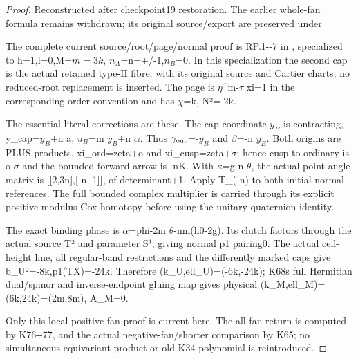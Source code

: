 \begin{proof}
Reconstructed after checkpoint19 restoration. The earlier whole-fan formula remains withdrawn; its original source/export are preserved under 

The complete current source/root/page/normal proof is RP.1-\/-7 in , specialized to h=1,l=0,M=\(m=3k\), \(n_A\)=n=+/-1,\(n_B\)=0. In this specialization the second cap is the actual retained type-II fibre, with its original source and Cartier charts; no reduced-root replacement is inserted. The page is \(\eta\)\^{}m-\(\tau\) xi=1 in the corresponding order convention and has \(\chi\)=k, N²=-2k.

The essential literal corrections are these. The cap coordinate \(y_B\) is contracting, y\_cap=\(y_B\)+n a, \(u_B\)=m \(y_B\)+n \(\alpha\). Thus \(\gamma_{\rm out}\)=-\(y_B\) and \(\beta\)=-n \(y_B\). Both origins are PLUS products, xi\_ord=zeta+o and xi\_cusp=zeta+\(\sigma\); hence cusp-to-ordinary is o-\(\sigma\) and the bounded forward arrow is -nK. With \(\kappa\)=g-n \(\theta\), the actual point-angle matrix is {[}{[}2,3n{]},{[}-n,-1{]}{]}, of determinant+1. Apply T\_(-n) to both initial normal references. The full bounded complex multiplier is carried through its explicit positive-modulus Cox homotopy before using the unitary quaternion identity.

The exact binding phase is \(\alpha\)=phi-2m \(\theta\)-nm(h0-2g). Its clutch factors through the actual source T² and parameter S¹, giving normal p1 pairing0. The actual ceil-height line, all regular-band restrictions and the differently marked caps give b\_U²=-8k,p1(TX)=-24k. Therefore (k\_U,ell\_U)=(-6k,-24k); K68\textquotesingle s full Hermitian dual/spinor and inverse-endpoint gluing map gives physical (k\_M,ell\_M)=(6k,24k)=(2m,8m), A\_M=0.

Only this local positive-fan proof is current here. The all-fan return is computed by K76-\/-77, and the actual negative-fan/shorter comparison by K65; no simultaneous equivariant product or old K34 polynomial is reintroduced.

\end{proof}
